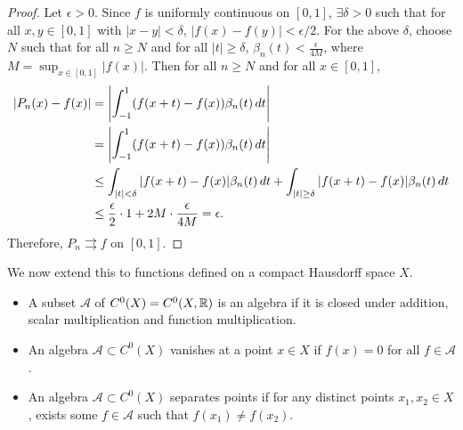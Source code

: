 \begin{thm}
\begin{proof}
        Let $\epsilon > 0$. Since $f$ is uniformly continuous on $[0, 1]$, $\exists \delta > 0$ such that for all $x, y \in [0, 1]$ with $|x - y| < \delta$, $|f(x) - f(y)| < \epsilon/2$. For the above $\delta$, choose $N$ such that for all $n \geq N$ and for all $|t| \geq \delta$, $\beta_n(t) < \frac{\epsilon}{4M}$, where $M = \sup_{x \in [0, 1]} |f(x)|$. Then for all $n \geq N$ and for all $x \in [0, 1]$,
        \begin{align*}
            |P_n(x) - f(x)| &= {\left| \int_{-1}^1 (f(x + t) - f(x)) \beta_n(t) \, dt \right|} \\
            &= {\left| \int_{-1}^1 (f(x + t) - f(x)) \beta_n(t) \, dt \right|} \\
            &\leq \int_{|t| < \delta} |f(x + t) - f(x)| \beta_n(t) \, dt + \int_{|t| \geq \delta} |f(x + t) - f(x)| \beta_n(t) \, dt \\
            &\leq \frac{\epsilon}{2} \cdot 1 + 2M \cdot \frac{\epsilon}{4M} = \epsilon.
        \end{align*}
        Therefore, $P_n \rightrightarrows f$ on $[0, 1]$.
    \end{proof}
\end{thm}

We now extend this to functions defined on a compact Hausdorff space $X$.

\begin{df}
    \nobreakspace
    \begin{itemize}
        \item A subset $\mathcal A$ of $C^0(X) = C^0(X, {\mathbb R})$ is an algebra if it is closed under addition, scalar multiplication and function multiplication.
        \item An algebra $\mathcal A \subset C^0(X)$ vanishes at a point $x \in X$ if $f(x) = 0$ for all $f \in \mathcal A$.
        \item An algebra $\mathcal A \subset C^0(X)$ separates points if for any distinct points $x_1, x_2 \in X$, exists some $f \in \mathcal A$ such that $f(x_1) \neq f(x_2)$.
    \end{itemize}
\end{df}

